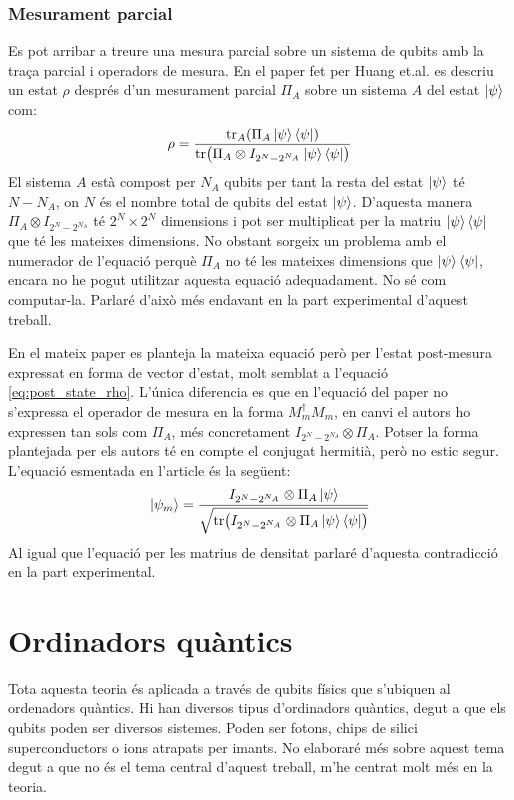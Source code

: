 \subsubsection{Mesurament parcial}
\label{par_measurament}
Es pot arribar a treure una mesura parcial sobre un sistema de qubits amb la traça parcial i operadors de mesura. En el paper fet per Huang et.al. \cite{QGAN_exp} es descriu un estat $\rho$ després d'un mesurament parcial $\Pi_A$ sobre un sistema $A$ del estat $\ket{\psi}$ com:
$$
\rho = \frac{\tr_A(\Pi_A \ket{\psi}\bra{\psi})}{\tr(\Pi_A\otimes I_{2^N-2^{N_A}}\ket{\psi}\bra{\psi})}
$$
El sistema $A$ està compost per $N_A$ qubits per tant la resta del estat $\ket{\psi}$ té $N-N_A$, on $N$ és el nombre total de qubits del estat $\ket{\psi}$. D'aquesta manera $\Pi_A\otimes I_{2^N-2^{N_A}}$ té $2^N\times 2^N$ dimensions i pot ser multiplicat per la matriu $\ket{\psi}\bra{\psi}$ que té les mateixes dimensions. No obstant sorgeix un problema amb el numerador de l'equació perquè $\Pi_A$ no té les mateixes dimensions que $\ket{\psi}\bra{\psi}$, encara no he pogut utilitzar aquesta equació adequadament. No sé com computar-la. Parlaré d'això més endavant en la part experimental d'aquest treball.

En el mateix paper es planteja la mateixa equació però per l'estat post-mesura expressat en forma de vector d'estat, molt semblat a l'equació \ref{eq:post_state_rho}. L'única diferencia es que en l'equació del paper no s'expressa el operador de mesura en la forma $M_m^\dagger M_m$, en canvi el autors ho expressen tan sols com $\Pi_A$, més concretament  $I_{2^N-2^{N_A}}\otimes \Pi_A$. Potser la forma plantejada per els autors té en compte el conjugat hermitià, però no estic segur.
L'equació esmentada en l'article és la següent:
$$
\ket{\psi_m} = \frac{I_{2^N-2^{N_A}}\otimes\Pi_A\ket{\psi}}{\sqrt{\tr(I_{2^N-2^{N_A}}\otimes\Pi_A\ket{\psi}\bra{\psi})}}
$$
Al igual que l'equació per les matrius de densitat parlaré d'aquesta contradicció en la part experimental.

\section{Ordinadors quàntics}
Tota aquesta teoria és aplicada a través de qubits físics que s'ubiquen al ordenadors quàntics. Hi han diversos tipus d'ordinadors quàntics, degut a que els qubits poden ser diversos sistemes. Poden ser fotons, chips de silici superconductors o ions atrapats per imants. No elaboraré més sobre aquest tema degut a que no és el tema central d'aquest treball, m'he centrat molt més en la teoria. 

